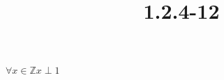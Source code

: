 \documentclass{article}
\title{1.2.4-12}
\begin{document}
\maketitle

\( \forall x \in \mathbb{Z} x \perp 1 \)
\end{document}
